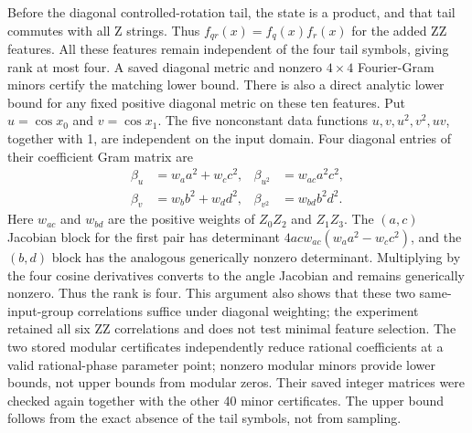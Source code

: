 Before the diagonal controlled-rotation tail, the state is a product,
and that tail commutes with all Z strings. Thus $f_{qr}(x)=f_q(x)f_r(x)$
for the added ZZ features. All these features remain independent of
the four tail symbols, giving rank at most four. A saved diagonal
metric and nonzero $4\times4$ Fourier-Gram minors certify the matching
lower bound. There is also a direct analytic lower bound for any fixed
positive diagonal metric on these ten features. Put
$u=\cos x_0$ and $v=\cos x_1$. The five nonconstant data functions
$u,v,u^2,v^2,uv$, together with 1, are independent on the input
domain. Four diagonal entries of their coefficient Gram matrix are
\begin{equation}
 \begin{aligned}
 \beta_u&=w_a a^2+w_c c^2,&\beta_{u^2}&=w_{ac}a^2c^2,\\
 \beta_v&=w_b b^2+w_d d^2,&\beta_{v^2}&=w_{bd}b^2d^2.
 \end{aligned}
\end{equation}
Here $w_{ac}$ and $w_{bd}$ are the positive weights of $Z_0Z_2$
and $Z_1Z_3$. The $(a,c)$ Jacobian block for the first pair has
determinant $4acw_{ac}(w_a a^2-w_c c^2)$, and the $(b,d)$ block
has the analogous generically nonzero determinant. Multiplying
by the four cosine derivatives converts to the angle Jacobian and
remains generically nonzero. Thus the rank is four. This argument
also shows that these two same-input-group correlations suffice
under diagonal weighting; the experiment retained all six ZZ
correlations and does not test minimal feature selection.
The two stored modular certificates independently reduce rational coefficients
at a valid rational-phase parameter point; nonzero modular minors
provide lower bounds, not upper bounds from modular zeros. Their
saved integer matrices were checked again together with the other
40 minor certificates. The upper bound follows from the exact absence
of the tail symbols, not from sampling.


